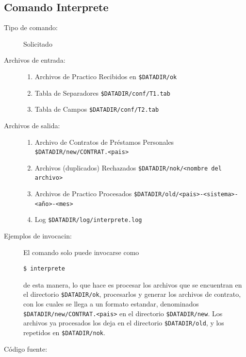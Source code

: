 \documentclass[12pt]{article}
\begin{document}
\subsection{Comando Interprete}
\begin{description}
	\item [Tipo de comando:] Solicitado
	
	\item [Archivos de entrada:]
	\begin{enumerate}
		\item Archivos de Practico Recibidos en \verb|$DATADIR/ok|
		\item Tabla de Separadores \verb|$DATADIR/conf/T1.tab|
		\item Tabla de Campos \verb|$DATADIR/conf/T2.tab|
	\end{enumerate}
	
	\item [Archivos de salida:]
	\begin{enumerate}
		\item Archivo de Contratos de Préstamos Personales \verb|$DATADIR/new/CONTRAT.<pais>|
		\item Archivos (duplicados) Rechazados \verb|$DATADIR/nok/<nombre del archivo>|
		\item Archivos de Practico Procesados \verb|$DATADIR/old/<pais>-<sistema>-<año>-<mes>|
		\item Log \verb|$DATADIR/log/interprete.log|
	\end{enumerate}
	
	\item [Ejemplos de invocacin:]	El comando solo puede invocarse como
	\begin{verbatim}$ interprete\end{verbatim}
	de esta manera, lo que hace es procesar los archivos que se encuentran en el directorio \verb|$DATADIR/ok|, procesarlos y generar los archivos de contrato, con los cuales se llega a un formato estandar, denominados \verb|$DATADIR/new/CONTRAT.<pais>| en el directorio \verb|$DATADIR/new|. Los archivos ya procesados los deja en el directorio \verb|$DATADIR/old|, y los repetidos en \verb|$DATADIR/nok|.
	
	\item [Código fuente:]
\end{description}
	{\footnotesize
		
	}
\end{document}
